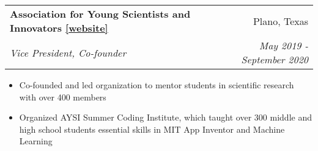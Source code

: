 \documentclass[letterpaper,11pt]{article}
\makeatletter
\newcommand{\resitem}[1]{\item[--] #1 \vspace{-8pt}}
\newcommand{\ressubheading}[4]{
	\vspace{6pt}
	\begin{tabular*}{7.5in}{l@{\extracolsep{\fill}}r}
			\textbf{#1} & #2 \\
			\textit{#3} & \textit{#4}
	\end{tabular*}
	\vspace{-12pt}
}
\makeatother
\begin{document}
	\ressubheading{Association for Young Scientists and Innovators \href{https://www.aysi.org}{[website]}}{Plano, Texas}{Vice President, Co-founder}{May 2019 - September 2020}
		\begin{itemize}[leftmargin=*]
			\resitem{Co-founded and led organization to mentor students in scientific research with over 400 members}
			\resitem{Organized AYSI Summer Coding Institute, which taught over 300 middle and high school students essential skills in MIT App Inventor and Machine Learning}
		\end{itemize}



\end{document}

